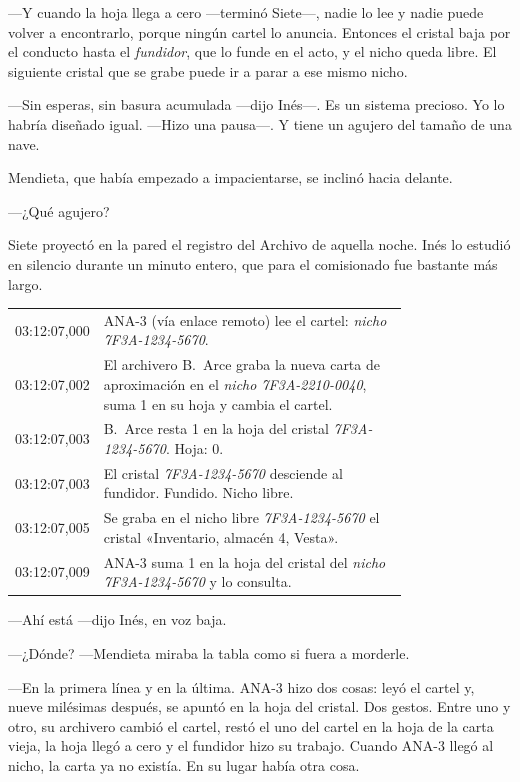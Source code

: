 ---Y cuando la hoja llega a cero ---terminó Siete---\nobreak, nadie lo lee y nadie puede volver a encontrarlo, porque ningún cartel lo anuncia. Entonces el cristal baja por el conducto hasta el \emph{fundidor}, que lo funde en el acto, y el nicho queda libre. El siguiente cristal que se grabe puede ir a parar a ese mismo nicho.

---Sin esperas, sin basura acumulada ---dijo Inés---\nobreak. Es un sistema precioso. Yo lo habría diseñado igual. ---Hizo una pausa---\nobreak. Y tiene un agujero del tamaño de una nave.

Mendieta, que había empezado a impacientarse, se inclinó hacia delante.

---¿Qué agujero?

\escena
Siete proyectó en la pared el registro del Archivo de aquella noche. Inés lo estudió en silencio durante un minuto entero, que para el comisionado fue bastante más largo.

\begin{documento}
\begin{tabular}{@{}l p{0.78\linewidth}@{}}
03:12:07,000 & ANA-3 (vía enlace remoto) lee el cartel: \emph{nicho 7F3A-1234-5670}. \\
03:12:07,002 & El archivero B.~Arce graba la nueva carta de aproximación en el \emph{nicho 7F3A-2210-0040}, suma 1 en su hoja y cambia el cartel. \\
03:12:07,003 & B.~Arce resta 1 en la hoja del cristal \emph{7F3A-1234-5670}. Hoja: 0. \\
03:12:07,003 & El cristal \emph{7F3A-1234-5670} desciende al fundidor. Fundido. Nicho libre. \\
03:12:07,005 & Se graba en el nicho libre \emph{7F3A-1234-5670} el cristal «Inventario, almacén 4, Vesta». \\
03:12:07,009 & ANA-3 suma 1 en la hoja del cristal del \emph{nicho 7F3A-1234-5670} y lo consulta. \\
\end{tabular}
\end{documento}

---Ahí está ---dijo Inés, en voz baja.

---¿Dónde? ---Mendieta miraba la tabla como si fuera a morderle.

---En la primera línea y en la última. ANA-3 hizo dos cosas: leyó el cartel y, nueve milésimas después, se apuntó en la hoja del cristal. Dos gestos. Entre uno y otro, su archivero cambió el cartel, restó el uno del cartel en la hoja de la carta vieja, la hoja llegó a cero y el fundidor hizo su trabajo. Cuando ANA-3 llegó al nicho, la carta ya no existía. En su lugar había otra cosa.

